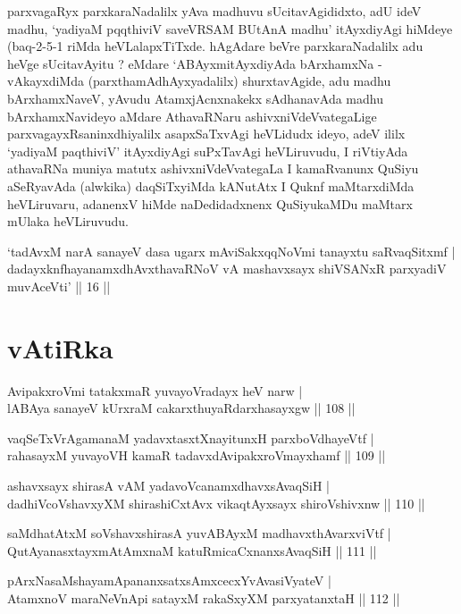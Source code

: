 \begin{artha}
parxvagaRyx parxkaraNadalilx yAva madhuvu 
sUcitavAgididxto, adU ideV madhu, `yadiyaM pqqthiviV saveVRSAM BUtAnA madhu' itAyxdiyAgi hiMdeye
(baq-2-5-1 riMda heVLalapxTiTxde. hAgAdare beVre parxkaraNadalilx adu
heVge sUcitavAyitu ? eMdare `ABAyxmitAyxdiyAda bArxhamxNa - vAkayxdiMda (parxthamAdhAyxyadalilx) shurxtavAgide, adu madhu
bArxhamxNaveV, yAvudu AtamxjAcnxnakekx sAdhanavAda madhu
bArxhamxNavideyo aMdare AthavaRNaru ashivxniVdeVvategaLige
parxvagayxRsaninxdhiyalilx asapxSaTxvAgi heVLidudx ideyo, adeV ililx
`yadiyaM paqthiviV' itAyxdiyAgi suPxTavAgi heVLiruvudu, I riVtiyAda athavaRNa
muniya matutx ashivxniVdeVvategaLa I kamaRvanunx QuSiyu aSeRyavAda
(alwkika) daqSiTxyiMda kANutAtx I Quknf maMtarxdiMda heVLiruvaru,
adanenxV hiMde naDedidadxnenx QuSiyukaMDu maMtarx mUlaka heVLiruvudu.
\end{artha}


\begin{shl}
`tadAvxM narA sanayeV dasa ugarx mAviSakxqqNoVmi tanayxtu saRvaqSitxmf | dadayxknfhayanamxdhAvxthavaRNoV vA mashavxsayx shiVSANxR parxyadiV muvAceVti' || 16 ||
\end{shl}

\section*{vAtiRka}

\begin{shl}
AvipakxroVmi tatakxmaR yuvayoVradayx heV narw |\\
lABAya sanayeV kUrxraM cakarxthuyaRdarxhasayxgw \hfill || 108 ||
\end{shl}
\begin{shl}
vaqSeTxVrAgamanaM yadavxtasxtXnayitunxH parxboVdhayeVtf |\\
rahasayxM yuvayoVH kamaR tadavxdAvipakxroVmayxhamf \hfill || 109 ||
\end{shl}
\begin{shl}
ashavxsayx shirasA vAM yadavoVcanamxdhavxsAvaqSiH |\\
dadhiVcoV\s shavxyXM shirashiCxtAvx vikaqtAyxsayx shiroV\s shivxnw \hfill || 110 ||
\end{shl}
\begin{shl}
saMdhatAtxM soV\s shavxshirasA yuvABAyxM madhavxthAvarxviVtf |\\
QutAyanasxtayxmAtAmxnaM katuRmicaCxnanxsAvaqSiH \hfill || 111 ||
\end{shl}
\begin{shl}
pArxNasaMshayamApananxsatxsAmxcecxYvAvasiVyateV |\\
AtamxnoV maraNeVnApi satayxM rakaSxyXM parxyatanxtaH \hfill || 112 ||
\end{shl}

